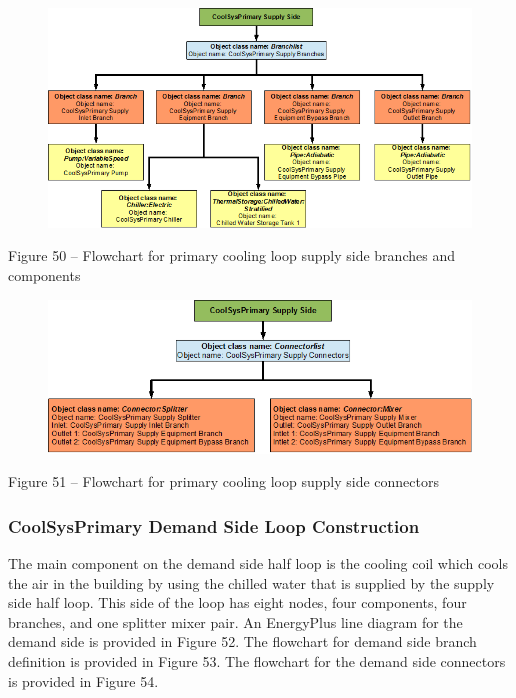 \begin{figure}[htbp]
\centering
\includegraphics{media/image050.png}
\caption{}
\end{figure}

Figure 50 -- Flowchart for primary cooling loop supply side branches and components

\begin{figure}[htbp]
\centering
\includegraphics{media/image051.png}
\caption{}
\end{figure}

Figure 51 -- Flowchart for primary cooling loop supply side connectors

\subsubsection{CoolSysPrimary Demand Side Loop Construction}\label{coolsysprimary-demand-side-loop-construction}

The main component on the demand side half loop is the cooling coil which cools the air in the building by using the chilled water that is supplied by the supply side half loop. This side of the loop has eight nodes, four components, four branches, and one splitter mixer pair. An EnergyPlus line diagram for the demand side is provided in Figure 52. The flowchart for demand side branch definition is provided in Figure 53. The flowchart for the demand side connectors is provided in Figure 54.

